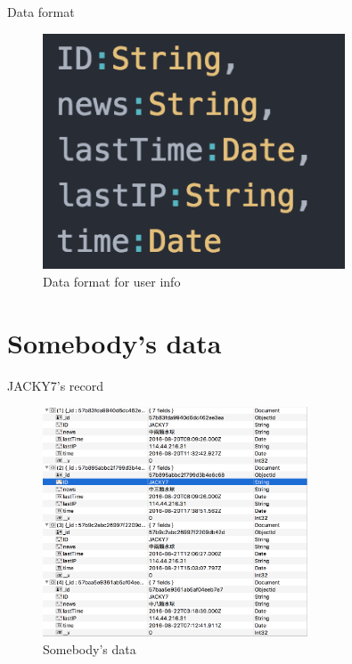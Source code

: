 \documentclass{beamer}
\begin{document}
\begin{frame}{Data format}
\begin{figure}[t]
    \centering
    \includegraphics[width=0.8\textwidth]{figures/1.png}
    \caption{Data format for user info}
\end{figure}
\end{frame}

\section{Somebody's data}

\begin{frame}{JACKY7's record}
\begin{figure}[t]
    \centering
    \includegraphics[width=0.7\textwidth]{figures/2.png}
    \caption{Somebody's data}
\end{figure}
\end{frame}
\section{}
\end{document}
